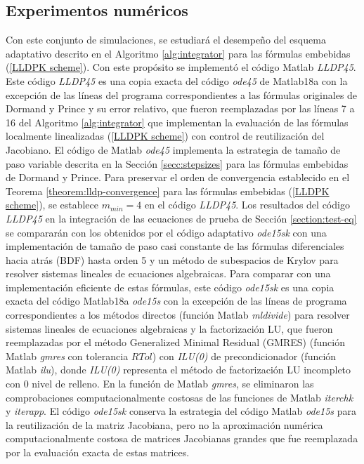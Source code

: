 \subsection{Experimentos numéricos}\label{section:num-exp-lldp-var-step}
Con este conjunto de simulaciones, se estudiará el desempeño del esquema adaptativo descrito en el Algoritmo \ref{alg:integrator} para las fórmulas embebidas (\ref{LLDPK scheme}). Con este propósito se implementó el código Matlab \emph{LLDP45}. Este código \emph{LLDP45} es una copia exacta del código \emph{ode45} \cite{shampine1997matlab} de Matlab18a con la excepción de las líneas del programa correspondientes a las fórmulas originales de Dormand y Prince y su error relativo, que fueron reemplazadas por las líneas 7 a 16 del Algoritmo \ref{alg:integrator} que implementan la evaluación de las fórmulas localmente linealizadas (\ref{LLDPK scheme}) con control de reutilización del Jacobiano. El código de Matlab \emph{ode45} implementa la estrategia de tamaño de paso variable descrita en la Sección \ref{secc:stepsizes} para las fórmulas embebidas de Dormand y Prince. Para preservar el orden de convergencia establecido en el Teorema \ref{theorem:lldp-convergence} para las fórmulas embebidas (\ref{LLDPK scheme}), se establece $m_{min}=4$ en el código \emph{LLDP45}.
Los resultados del código \emph{LLDP45} en la integración de las ecuaciones de prueba de Sección \ref{section:test-eq} se compararán con los obtenidos por el código adaptativo \emph{ode15sk} con una implementación de tamaño de paso casi constante de las fórmulas diferenciales hacia atrás (BDF) hasta orden 5 y un método de subespacios de Krylov para resolver sistemas lineales de ecuaciones algebraicas. Para comparar con una implementación eficiente de estas fórmulas, este código \emph{ode15sk} es una copia exacta del código Matlab18a \emph{ode15s} \cite{shampine1997matlab} con la excepción de las líneas de programa correspondientes a los métodos directos (función Matlab \emph{mldivide}) para resolver sistemas lineales de ecuaciones algebraicas y la factorización LU, que fueron reemplazadas por el método Generalized Minimal Residual (GMRES) (función Matlab \emph{gmres} con tolerancia $RTol$) con \emph{ILU(0)} de precondicionador (función Matlab \emph{ilu}), donde \emph{ILU(0)} representa el método de factorización LU incompleto con 0 nivel de relleno. En la función de Matlab \emph{gmres}, se eliminaron las comprobaciones computacionalmente costosas de las funciones de Matlab \emph{iterchk} y \emph{iterapp}. El código \emph{ode15sk} conserva la estrategia del código Matlab \emph{ode15s} para la reutilización de la matriz Jacobiana, pero no la aproximación numérica computacionalmente costosa de matrices Jacobianas grandes que fue reemplazada por la evaluación exacta de estas matrices.
